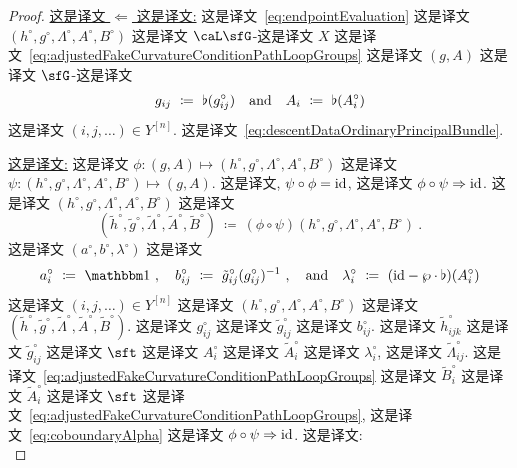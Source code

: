 \documentclass[
    affil-it, %
    auth-lg, %
    british, %
    compression, %
    contents, %
    custom-packages={}, %
    references={bigone}, %
]{lib/preprint}
\newcommand{\boundary}{\flat}
\begin{document}
\begin{body}
\begin{proof}
            \vspace{5pt}
 \noindent \uline{这是译文 $\Leftarrow$ 这是译文:}  这是译文~\eqref{eq:endpointEvaluation} 这是译文 $(h^\circ,g^\circ,\Lambda^\circ,A^\circ,B^\circ)$ 这是译文 $\caL\sfG$-这是译文 $X$ 这是译文~\eqref{eq:adjustedFakeCurvatureConditionPathLoopGroups} 这是译文 $(g,A)$ 这是译文 $\sfG$-这是译文             \begin{equation}\label{eq:recover_ordinary_cocycles}
                g_{ij}\ \coloneqq\ \boundary(g_{ij}^\circ)
                \eand
                A_i\ \coloneqq\ \boundary(A_i^\circ)
            \end{equation}  这是译文 $(i,j,\ldots)\in Y^{[n]}$. 这是译文~\eqref{eq:descentDataOrdinaryPrincipalBundle}.

            \vspace{5pt}
 \noindent \uline{这是译文:}  这是译文 $\phi:(g,A)\mapsto(h^\circ,g^\circ,\Lambda^\circ,A^\circ,B^\circ)$ 这是译文 $\psi:(h^\circ,g^\circ,\Lambda^\circ,A^\circ,B^\circ)\mapsto(g,A)$. 这是译文, $\psi\circ\phi=\mathrm{id}$, 这是译文 $\phi\circ\psi\Rightarrow\mathrm{id}$. 这是译文 $(h^\circ,g^\circ,\Lambda^\circ,A^\circ,B^\circ)$ 这是译文             \begin{equation}
                (\tilde h^\circ,\tilde g^\circ,\tilde\Lambda^\circ,\tilde A^\circ,\tilde B^\circ)\ \coloneqq\ (\phi\circ\psi)(h^\circ,g^\circ,\Lambda^\circ,A^\circ,B^\circ)~.
            \end{equation}  这是译文 $(a^\circ,b^\circ,\lambda^\circ)$ 这是译文             \begin{equation}\label{eq:coboundaryAlpha}
                a^\circ_i\ \coloneqq\ \unit~,
                \quad
                b^\circ_{ij}\ \coloneqq\ \tilde g^\circ_{ij}(g^\circ_{ij})^{-1}~,
                \eand
                \lambda^\circ_i\ \coloneqq\ (\id-\wp\cdot\boundary)(A^\circ_i)
            \end{equation}  这是译文 $(i,j,\ldots)\in Y^{[n]}$ 这是译文 $(h^\circ,g^\circ,\Lambda^\circ,A^\circ,B^\circ)$ 这是译文 $(\tilde h^\circ,\tilde g^\circ,\tilde\Lambda^\circ,\tilde A^\circ,\tilde B^\circ)$. 这是译文 $g^\circ_{ij}$ 这是译文 $\tilde g^\circ_{ij}$ 这是译文 $b^\circ_{ij}$. 这是译文 $\tilde h^\circ_{ijk}$ 这是译文 $\tilde g^\circ_{ij}$ 这是译文 $\sft$ 这是译文 $A^\circ_i$ 这是译文 $\tilde A^\circ_i$ 这是译文 $\lambda^\circ_i$, 这是译文 $\tilde \Lambda^\circ_{ij}$. 这是译文~\eqref{eq:adjustedFakeCurvatureConditionPathLoopGroups} 这是译文 $\tilde B^\circ_i$ 这是译文 $\tilde A^\circ_i$ 这是译文 $\sft$ 这是译文~\eqref{eq:adjustedFakeCurvatureConditionPathLoopGroups}, 这是译文~\eqref{eq:coboundaryAlpha} 这是译文 $\phi\circ\psi\Rightarrow\mathrm{id}$. 这是译文:             \begin{subequations}

\end{subequations}
\end{proof}
\end{body}
\end{document}
